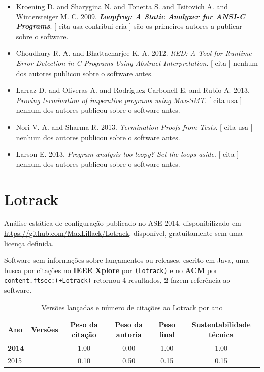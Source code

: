 \begin{itemize}
\item Kroening D. and Sharygina N. and Tonetta S. and Tsitovich A. and Wintersteiger M. C.
      2009.
        \textbf{\textit{ Loopfrog: A Static Analyzer for ANSI-C Programs}}.
      [
          cita
          usa
          contribui
          cria
      ]
são os primeiros autores a publicar sobre o software.
\item Choudhury R. A. and Bhattacharjee K. A.
      2012.
        \textit{ RED: A Tool for Runtime Error Detection in C Programs Using Abstract Interpretation}.
      [
          cita
      ]
nenhum dos autores publicou sobre o software antes.
\item Larraz D. and Oliveras A. and Rodríguez-Carbonell E. and Rubio A.
      2013.
        \textit{ Proving termination of imperative programs using Max-SMT}.
      [
          cita
          usa
      ]
nenhum dos autores publicou sobre o software antes.
\item Nori V. A. and Sharma R.
      2013.
        \textit{ Termination Proofs from Tests}.
      [
          cita
          usa
      ]
nenhum dos autores publicou sobre o software antes.
\item Larson E.
      2013.
        \textit{ Program analysis too loopy? Set the loops aside}.
      [
          cita
      ]
nenhum dos autores publicou sobre o software antes.
\end{itemize}
\section{Lotrack}

Análise estática de configuração
publicado no ASE 2014,
disponibilizado em \url{https://github.com/MaxLillack/Lotrack},
disponível,
gratuitamente
sem uma licença definida.

Software sem informações sobre lançamentos ou releases,
escrito em Java,
uma busca por citações no {\bf IEEE Xplore} por
\texttt{(Lotrack)}
e no {\bf ACM} por
\texttt{content.ftsec:(+Lotrack)}
retornou
4 resultados,
{\bf 2} fazem referência ao software.


\begin{table}[H]
\caption{Versões lançadas e número de citações ao Lotrack por ano}
\centering
\begin{tabular}{| l | c | c | c | c | c |}
  \hline
  Ano & Versões & Peso da citação & Peso da autoria & Peso final & Sustentabilidade técnica \\
  \hline
            {\bf 2014}
          &
          
          &
          1.00
          &
          0.00
          &
          1.00
          &
            {\color{blue} 1.00}
          \\
\hline
            2015
          &
          
          &
          0.10
          &
          0.50
          &
          0.15
          &
            {\color{red} 0.15}
          \\
\hline
\end{tabular}
\end{table}

